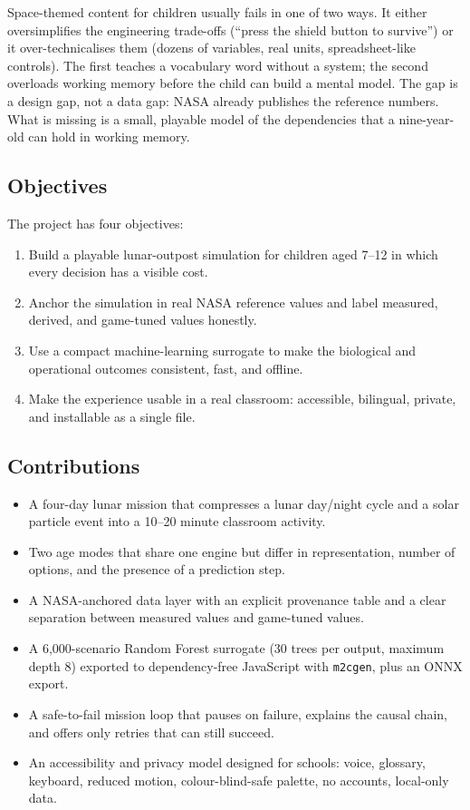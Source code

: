 \documentclass[11pt,a4paper]{article}
\newcommand{\code}[1]{\texttt{#1}}
\begin{document}
Space-themed content for children usually fails in one of two ways. It either oversimplifies the engineering trade-offs (``press the shield button to survive'') or it over-technicalises them (dozens of variables, real units, spreadsheet-like controls). The first teaches a vocabulary word without a system; the second overloads working memory before the child can build a mental model. The gap is a design gap, not a data gap: NASA already publishes the reference numbers. What is missing is a small, playable model of the dependencies that a nine-year-old can hold in working memory.

\subsection{Objectives}

The project has four objectives:

\begin{enumerate}
  \item Build a playable lunar-outpost simulation for children aged 7--12 in which every decision has a visible cost.
  \item Anchor the simulation in real NASA reference values and label measured, derived, and game-tuned values honestly.
  \item Use a compact machine-learning surrogate to make the biological and operational outcomes consistent, fast, and offline.
  \item Make the experience usable in a real classroom: accessible, bilingual, private, and installable as a single file.
\end{enumerate}

\subsection{Contributions}

\begin{itemize}
  \item A four-day lunar mission that compresses a lunar day/night cycle and a solar particle event into a 10--20 minute classroom activity.
  \item Two age modes that share one engine but differ in representation, number of options, and the presence of a prediction step.
  \item A NASA-anchored data layer with an explicit provenance table and a clear separation between measured values and game-tuned values.
  \item A 6,000-scenario Random Forest surrogate (30 trees per output, maximum depth 8) exported to dependency-free JavaScript with \code{m2cgen}, plus an ONNX export.
  \item A safe-to-fail mission loop that pauses on failure, explains the causal chain, and offers only retries that can still succeed.
  \item An accessibility and privacy model designed for schools: voice, glossary, keyboard, reduced motion, colour-blind-safe palette, no accounts, local-only data.
\end{itemize}
\end{document}
